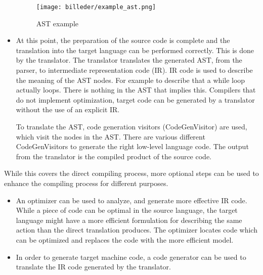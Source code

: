 \begin{itemize}
	\begin{figure}[H]
	\centering
		\texttt{[image: billeder/example\_ast.png]}
		\caption{AST example}
		\label{fig:ast_example}
\end{figure}
	
	

	\item At this point, the preparation of the source code is complete and the translation into the target language can be performed correctly. This is done by the translator. The translator translates the generated AST, from the parser, to intermediate representation code (IR). IR code is used to describe the meaning of the AST nodes. For example to describe that a while loop actually loops. There is nothing in the AST that implies this.     
Compilers that do not implement optimization, target code can be generated by a translator without the use of an explicit IR.

To translate the AST, code generation visitors (CodeGenVisitor) are used, which visit the nodes in the AST. There are various different CodeGenVisitors to generate the right low-level language code. The output from the translator is the compiled product of the source code.  
\end{itemize}

While this covers the direct compiling process, more optional steps can be used to enhance the compiling process for different purposes.\\

\begin{itemize}
\item An optimizer can be used to analyze, and generate more effective IR code. While a piece of code can be optimal in the source language, the target language might have a more efficient formulation for describing the same action than the direct translation produces. The optimizer locates code which can be optimized and replaces the code with the more efficient model. 

\item In order to generate target machine code, a code generator can be used to translate the IR code generated by the translator.  

\end{itemize}
